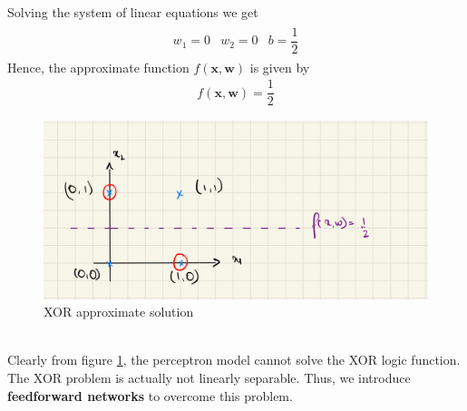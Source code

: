 Solving the system of linear equations we get
\begin{align}
\begin{matrix}
  w_1 = 0 & w_2 = 0 & b = \dfrac{1}{2}
\end{matrix}  
\end{align}
Hence, the approximate function $f(\textbf{x},\textbf{w})$ is given by
\begin{align}
  f(\textbf{x},\textbf{w}) = \dfrac{1}{2}
\end{align}
\begin{figure}[ht]
  \centering
  \includegraphics[scale=0.15]{CHAPTER_2/c2_fig_XOR_soln.jpeg}
  \caption{XOR approximate solution}
  \label{fig: approximate_XOR_solution}
\end{figure}\\
\noindent  Clearly from figure \ref{fig: approximate_XOR_solution}, the perceptron model cannot solve the XOR logic function. The XOR problem is actually not linearly separable. Thus, we introduce \textbf{feedforward networks} to overcome this problem.
